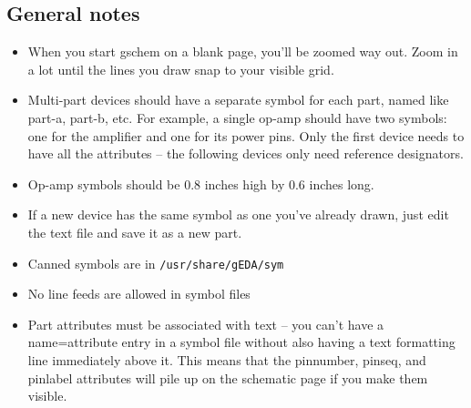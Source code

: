 \subsection{General notes}
\begin{itemize}
	\item When you start gschem on a blank page, you'll be zoomed way out.  Zoom in a lot until the lines you draw snap to your visible grid.
	\item Multi-part devices should have a separate symbol for each part, named like part-a, part-b, etc.  For example, a single op-amp should have two symbols: one for the amplifier and one for its power pins.  Only the first device needs to have all the attributes -- the following devices only need reference designators.
	\item Op-amp symbols should be 0.8 inches high by 0.6 inches long.
	\item If a new device has the same symbol as one you've already drawn, just edit the text file and save it as a new part.
	\item Canned symbols are in \texttt{/usr/share/gEDA/sym}
	\item No line feeds are allowed in symbol files
	\item Part attributes must be associated with text -- you can't have a name=attribute entry in a symbol file without also having a text formatting line immediately above it.  This means that the pinnumber, pinseq, and pinlabel attributes will pile up on the schematic page if you make them visible.
\end{itemize}



